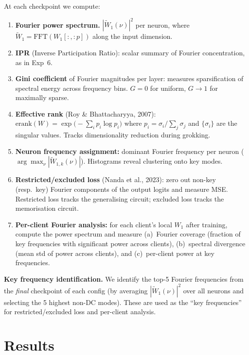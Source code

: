 \documentclass{article}
\begin{document}
At each checkpoint we compute:

\begin{enumerate}[nosep]
\item \textbf{Fourier power spectrum.}  $|\tilde{W}_1(\nu)|^2$ per neuron,
where $\tilde{W}_1 = \mathrm{FFT}(W_1[:, :p])$ along the input dimension.
\item \textbf{IPR} (Inverse Participation Ratio): scalar summary of Fourier
concentration, as in Exp~6.
\item \textbf{Gini coefficient} of Fourier magnitudes per layer: measures
sparsification of spectral energy across frequency bins.
$G{=}0$ for uniform, $G{\to}1$ for maximally sparse.
\item \textbf{Effective rank} (Roy \& Bhattacharyya, 2007):
$\mathrm{erank}(W) = \exp\bigl(-\sum_i p_i \log p_i\bigr)$ where
$p_i = \sigma_i / \sum_j \sigma_j$ and $\{\sigma_i\}$ are the singular
values.  Tracks dimensionality reduction during grokking.
\item \textbf{Neuron frequency assignment:} dominant Fourier frequency per
neuron ($\arg\max_\nu |\tilde{W}_{1,k}(\nu)|$).  Histograms reveal
clustering onto key modes.
\item \textbf{Restricted/excluded loss} (Nanda et al., 2023): zero out
non-key (resp.\ key) Fourier components of the output logits and measure
MSE.  Restricted loss tracks the generalising circuit; excluded loss tracks
the memorisation circuit.
\item \textbf{Per-client Fourier analysis:} for each client's local $W_1$
after training, compute the power spectrum and measure (a)~Fourier coverage
(fraction of key frequencies with significant power across clients),
(b)~spectral divergence (mean std of power across clients), and
(c)~per-client power at key frequencies.
\end{enumerate}

\textbf{Key frequency identification.}  We identify the top-5 Fourier
frequencies from the \emph{final} checkpoint of each config (by averaging
$|\tilde{W}_1(\nu)|^2$ over all neurons and selecting the 5 highest
non-DC modes).  These are used as the ``key frequencies'' for
restricted/excluded loss and per-client analysis.

\section{Results}
\end{document}
